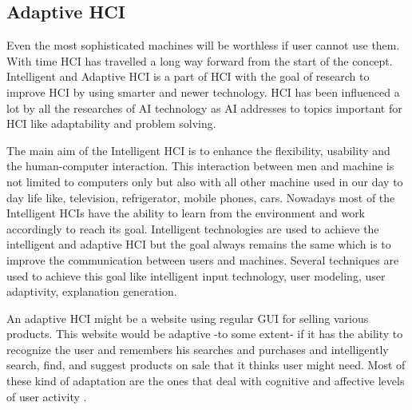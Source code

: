 \subsection{Adaptive HCI}
Even the most sophisticated machines will be worthless if user cannot use them.
With time HCI has travelled a long way forward from the start of the concept.
Intelligent and Adaptive HCI is a part of HCI with the goal of research to
improve HCI by using smarter and newer technology. HCI has been influenced a lot
by all the researches of AI technology as AI addresses to topics important for
HCI like adaptability and problem solving.

The main aim of the Intelligent HCI is to enhance the flexibility, usability and
the human-computer interaction. This interaction between men and machine is not
limited to computers only but also with all other machine used in our day to day
life like, television, refrigerator, mobile phones, cars. Nowadays most of the
Intelligent HCIs have the ability to learn from the environment and work
accordingly to reach its goal. Intelligent technologies are used to achieve the
intelligent and adaptive HCI but the goal always remains the same which is to
improve the communication between users and machines. Several techniques are
used to achieve this goal like intelligent input technology, user modeling, user
adaptivity, explanation generation.


An adaptive HCI might be a website using regular GUI for selling various
products. This website would be adaptive -to some extent- if it has the ability
to recognize the user and remembers his searches and purchases and intelligently
search, find, and suggest products on sale that it thinks user might need. Most
of these kind of adaptation are the ones that deal with cognitive and affective
levels of user activity \cite{karray2008human}.

